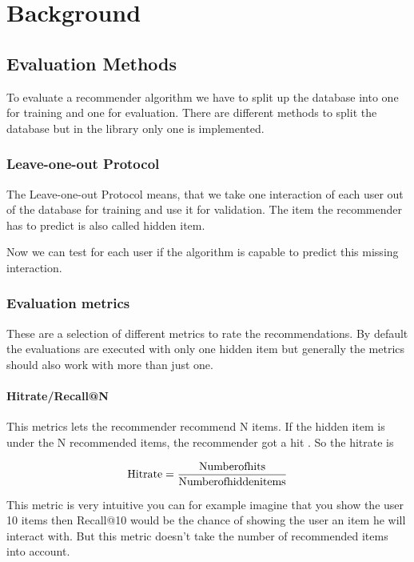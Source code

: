 
\chapter{Background}


\section{Evaluation Methods}

To evaluate a recommender algorithm we have to split up the database
into one for training and one for evaluation. There are different
methods to split the database but in the library only one is implemented.


\subsection{Leave-one-out Protocol}
\label{leaveoneout}

The Leave-one-out Protocol means, that we take one interaction of
each user out of the database for training and use it for validation.
The item the recommender has to predict is also called hidden item. 

Now we can test for each user if the algorithm is capable to predict
this missing interaction.


\subsection{Evaluation metrics}
\label{evaluationmetrics}

These are a selection of different metrics to rate the recommendations.
By default the evaluations are executed with only one hidden item
but generally the metrics should also work with more than just one.


\subsubsection{Hitrate/Recall@N}

This metrics lets the recommender recommend N items. If the hidden
item is under the N recommended items, the recommender got a hit \cite{Karypis:2001:EIT:502585.502627, Sarwar00applicationof}.
So the hitrate is 

\[
\mathrm{\textrm{Hitrate}}=\frac{\textrm{\ensuremath{\mathrm{Number}}ofhits}}{\textrm{Numberofhiddenitems}}
\]


This metric is very intuitive you can for example imagine that you
show the user 10 items then Recall@10 would be the chance of showing
the user an item he will interact with. But this metric doesn't take
the number of recommended items into account.


